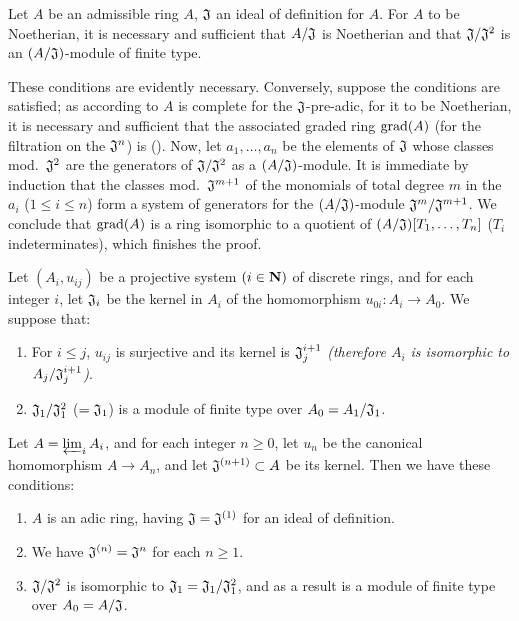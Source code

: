 \begin{cor}[7.2.6]
\label{0.7.2.6}
Let $A$ be an admissible ring $A$, $\mathfrak{J}$ an ideal of definition for
$A$. For $A$ to be Noetherian, it is necessary and sufficient that
$A/\mathfrak{J}$ is Noetherian and that $\mathfrak{J}/\mathfrak{J}^2$ is an
$(A/\mathfrak{J})$-module of finite type.
\end{cor}

These conditions are evidently necessary. Conversely, suppose the conditions
are satisfied; as according to  $A$ is complete for the
$\mathfrak{J}$-pre-adic, for it to be Noetherian, it is necessary and sufficient
that the associated graded ring ${\mathop{\mathrm{grad}}\nolimits}(A)$ (for the filtration on the
$\mathfrak{J}^n$) is (\cite[p~.18--07, th.~4]{I-1}). Now, let $a_1,\dots,a_n$ be
the elements of $\mathfrak{J}$ whose classes mod.~$\mathfrak{J}^2$ are the
generators of $\mathfrak{J}/\mathfrak{J}^2$ as a $(A/\mathfrak{J})$-module. It
is immediate by induction that the classes mod.~$\mathfrak{J}^{m+1}$ of the
monomials of total degree $m$ in the $a_i$ ($1\leqslant i\leqslant n$) form a
system of generators for the $(A/\mathfrak{J})$-module
$\mathfrak{J}^m/\mathfrak{J}^{m+1}$. We conclude that ${\mathop{\mathrm{grad}}\nolimits}(A)$ is a ring
isomorphic to a quotient of $(A/\mathfrak{J})[T_1,\dots,T_n]$ ($T_i$
indeterminates), which finishes the proof.

\begin{prop}[7.2.7]
\label{0.7.2.7}
Let $(A_i,u_{ij})$ be a projective system $(i\in\mathbf{N})$ of discrete rings, and
for each integer $i$, let $\mathfrak{J}_i$ be the kernel in $A_i$ of the
homomorphism $u_{0i}:A_i\to A_0$. We suppose that:
\begin{enumerate}[label={\rm(\alph*)}]
  \item For $i\leqslant j$, $u_{ij}$ is surjective and its kernel is $\mathfrak{J}_j^{i+1}$
    {\em (therefore $A_i$ is isomorphic to $A_j/\mathfrak{J}_j^{i+1}$)}.
  \item $\mathfrak{J}_1/\mathfrak{J}_1^2$ ($=\mathfrak{J}_1$) is a module of
    finite type over $A_0=A_1/\mathfrak{J}_1$.
\end{enumerate}
Let $A=\varprojlim_i A_i$, and for each integer $n\geqslant 0$, let $u_n$ be the
canonical homomorphism $A\to A_n$, and let $\mathfrak{J}^{(n+1)}\subset A$ be
its kernel. Then we have these conditions:
\begin{enumerate}[label={\rm(\roman*)}]
  \item $A$ is an adic ring, having $\mathfrak{J}=\mathfrak{J}^{(1)}$ for an
    ideal of definition.
  \item We have $\mathfrak{J}^{(n)}=\mathfrak{J}^n$ for each $n\geqslant 1$.
  \item $\mathfrak{J}/\mathfrak{J}^2$ is isomorphic to
    $\mathfrak{J}_1=\mathfrak{J}_1/\mathfrak{J}_1^2$, and as a result is a module of finite type
    over $A_0=A/\mathfrak{J}$.
\end{enumerate}
\end{prop}

